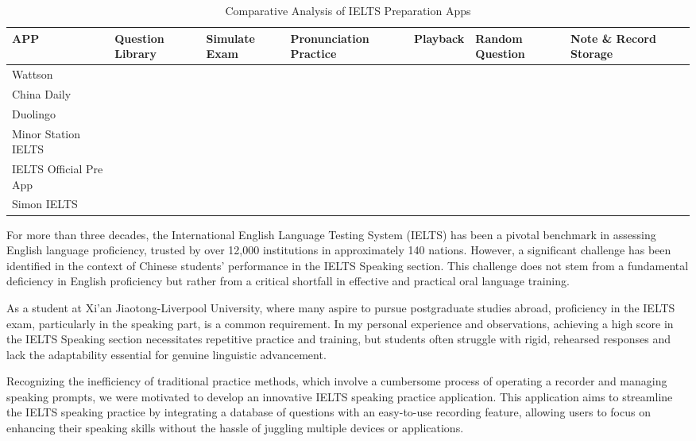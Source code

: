 \documentclass[conference,10pt,letterpaper]{IEEEtran}
\begin{document}
	\begin{table}[b]
		\centering
		\caption{Comparative Analysis of IELTS Preparation Apps}
		\label{tab:my-table}
		\begin{tabularx}{\textwidth}{@{}l *{6}{X} c@{}} %
			\toprule
			\textbf{APP} & \textbf{Question Library} & \textbf{Simulate Exam} & \textbf{Pronunciation Practice} & \textbf{Playback} & \textbf{Random Question} & \textbf{Note \& Record Storage} \\
			\midrule
			Wattson                & \checkmark & & & \checkmark & \checkmark & \checkmark \\
			China Daily            & & & \checkmark & & & \\
			Duolingo               & & & \checkmark & & & \\
			Minor Station IELTS    & \checkmark & \checkmark & & \checkmark & & \\
			IELTS Official Pre App & \checkmark & \checkmark & & \checkmark & \checkmark & \\
			Simon IELTS            & \checkmark & \checkmark & & & \checkmark & \\
			\bottomrule
		\end{tabularx}
	\end{table}
	
	For more than three decades, the International English Language Testing System (IELTS) has been a pivotal benchmark in assessing English language proficiency, trusted by over 12,000 institutions in approximately 140 nations. However, a significant challenge has been identified in the context of Chinese students' performance in the IELTS Speaking section. This challenge does not stem from a fundamental deficiency in English proficiency but rather from a critical shortfall in effective and practical oral language training.
	
	As a student at Xi'an Jiaotong-Liverpool University, where many aspire to pursue postgraduate studies abroad, proficiency in the IELTS exam, particularly in the speaking part, is a common requirement. In my personal experience and observations, achieving a high score in the IELTS Speaking section necessitates repetitive practice and training, but students often struggle with rigid, rehearsed responses and lack the adaptability essential for genuine linguistic advancement.
	
	Recognizing the inefficiency of traditional practice methods, which involve a cumbersome process of operating a recorder and managing speaking prompts, we were motivated to develop an innovative IELTS speaking practice application. This application aims to streamline the IELTS speaking practice by integrating a database of questions with an easy-to-use recording feature, allowing users to focus on enhancing their speaking skills without the hassle of juggling multiple devices or applications.
	
\end{document}

